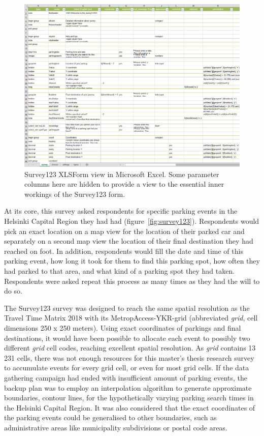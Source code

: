 \begin{figure}[H]%
    \includegraphics[width=\textwidth]{images/survey123_xlsform.png}
    \caption[Survey123 XLSForm view]{Survey123 XLSForm view in Microsoft Excel. Some parameter columns here are hidden to provide a view to the essential inner workings of the Survey123 form.}%
    \label{fig:survey123_xlsform}%
\end{figure}

At its core, this survey asked respondents for specific parking events in the Helsinki Capital Region they had had (figure~\ref{fig:survey123}). Respondents would pick an exact location on a map view for the location of their parked car and separately on a second map view the location of their final destination they had reached on foot. In addition, respondents would fill the date and time of this parking event, how long it took for them to find this parking spot, how often they had parked to that area, and what kind of a parking spot they had taken. Respondents were asked repeat this process as many times as they had the will to do so.

The Survey123 survey was designed to reach the same spatial resolution as the Travel Time Matrix 2018 with its MetropAccess-YKR-grid (abbreviated \textit{grid}, cell dimensions 250 x 250 meters). Using exact coordinates of parkings and final destinations, it would have been possible to allocate each event to possibly two different \textit{grid} cell codes, reaching excellent spatial resolution. As \textit{grid} contains 13 231 cells, there was not enough resources for this master's thesis research survey to accumulate events for every grid cell, or even for most grid cells. If the data gathering campaign had ended with insufficient amount of parking events, the backup plan was to employ an interpolation algorithm to generate approximate boundaries, contour lines, for the hypothetically varying parking search times in the Helsinki Capital Region. It was also considered that the exact coordinates of the parking events could be generalised to other boundaries, such as administrative areas like municipality subdivisions or postal code areas.

